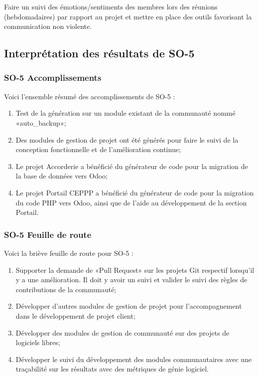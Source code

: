 Faire un suivi des émotions/sentiments des membres lors des réunions (hebdomadaires) par rapport au projet et mettre en place des outils favorisant la communication non violente.

\subsection{Interprétation des résultats de SO-5}

\subsubsection{SO-5 Accomplissements}
Voici l'ensemble résumé des accomplissements de SO-5 :
\begin{enumerate}
    \item Test de la génération sur un module existant de la communauté nommé «auto\_backup»;
    \item Des modules de gestion de projet ont été générés pour faire le suivi de la conception fonctionnelle et de l’amélioration continue;
    \item Le projet Accorderie a bénéficié du générateur de code pour la migration de la base de données vers Odoo;
    \item Le projet Portail CEPPP a bénéficié du générateur de code pour la migration du code PHP vers Odoo, ainsi que de l’aide au développement de la section Portail.
\end{enumerate}

\subsubsection{SO-5 Feuille de route}
Voici la briève feuille de route pour SO-5 :
\begin{enumerate}
    \item Supporter la demande de «Pull Request» sur les projets Git respectif lorsqu’il y a une amélioration. Il doit y avoir un suivi et valider le suivi des règles de contributions de la communauté;
    \item Développer d’autres modules de gestion de projet pour l’accompagnement dans le développement de projet client;
    \item Développer des modules de gestion de communauté sur des projets de logiciels libres;
    \item Développer le suivi du développement des modules communautaires avec une traçabilité sur les résultats avec des métriques de génie logiciel.
\end{enumerate}

